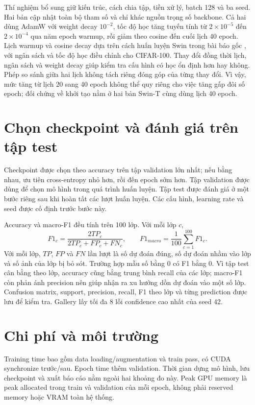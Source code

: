 \documentclass[12pt,a4paper]{report}
\begin{document}
Thí nghiệm bổ sung giữ kiến trúc, cách chia tập, tiền xử lý, batch 128 và
ba seed. Hai bản cập nhật toàn bộ tham số và chỉ khác nguồn trọng số
backbone. Cả hai dùng AdamW với weight decay $10^{-2}$, tốc độ học
tăng tuyến tính từ $2\times10^{-5}$ đến $2\times10^{-4}$ qua năm epoch warmup, rồi giảm theo cosine đến cuối lịch 40 epoch. Lịch warmup và cosine decay dựa trên cách huấn luyện Swin trong bài báo gốc \cite{swin},
với ngân sách và tốc độ học điều chỉnh cho CIFAR-100. Thay đổi đồng thời
lịch, ngân sách và weight decay giúp kiểm tra cấu hình có học
ổn định hơn hay không. Phép so sánh giữa hai lịch không tách riêng đóng góp
của từng thay đổi. Vì vậy, mức tăng từ lịch 20 sang 40 epoch không thể quy riêng cho việc tăng gấp đôi số epoch; đối chứng về khởi tạo nằm ở hai bản Swin-T cùng dùng lịch 40 epoch.

\section{Chọn checkpoint và đánh giá trên tập test}
Checkpoint được chọn theo accuracy trên tập validation lớn nhất; nếu bằng nhau, ưu tiên cross-entropy nhỏ hơn, rồi đến epoch sớm hơn. Tập validation được dùng để chọn mô hình trong quá trình huấn luyện.
Tập test được đánh giá ở một bước riêng sau khi hoàn tất các lượt huấn luyện.
Các cấu hình, learning rate và seed được cố định trước bước này.

Accuracy và macro-F1 đều tính trên 100 lớp. Với mỗi lớp $c$,
\begin{equation}
F1_c=\frac{2TP_c}{2TP_c+FP_c+FN_c},\qquad
F1_{macro}=\frac1{100}\sum_{c=1}^{100}F1_c.
\end{equation}
Với mỗi lớp, $TP$, $FP$ và $FN$ lần lượt là số dự đoán đúng, số dự đoán nhầm vào lớp và số ảnh của lớp bị bỏ sót. Trường hợp mẫu số bằng 0 có F1 bằng 0. Vì tập test cân bằng theo lớp, accuracy cũng bằng trung bình recall của các lớp; macro-F1 còn phản ánh precision nên giúp nhận ra xu hướng dồn dự đoán vào một số lớp. Confusion matrix, support, precision,
recall, F1 theo lớp và từng prediction được lưu để kiểm tra. Gallery lấy tối
đa 8 lỗi confidence cao nhất của seed 42.

\section{Chi phí và môi trường}
Training time bao gồm data loading/augmentation và train pass, có CUDA
synchronize trước/sau. Epoch time thêm validation. Thời gian dựng mô hình,
lưu checkpoint và xuất báo cáo nằm ngoài hai khoảng đo này. Peak GPU memory là peak allocated trong train và
validation của mỗi epoch, không phải reserved memory hoặc VRAM toàn hệ thống.
\end{document}
